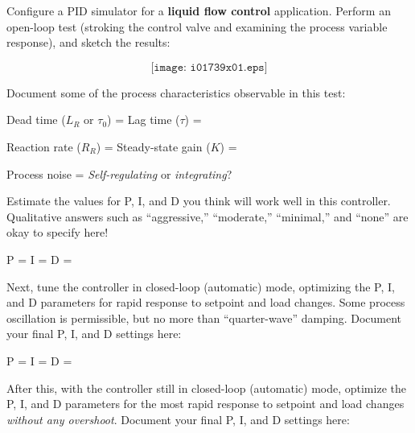 

Configure a PID simulator for a {\bf liquid flow control} application.  Perform an open-loop test (stroking the control valve and examining the process variable response), and sketch the results:

$$\texttt{[image: i01739x01.eps]}$$

Document some of the process characteristics observable in this test:

\vskip 20pt

Dead time ($L_R$ or $\tau_0$) = \underbar{\hskip 50pt} \hskip 50pt Lag time ($\tau$) = \underbar{\hskip 50pt} 

\vskip 10pt

Reaction rate ($R_R$) = \underbar{\hskip 50pt} \hskip 50pt Steady-state gain ($K$) = \underbar{\hskip 50pt}

\vskip 10pt

Process noise = \underbar{\hskip 70pt} \hskip 50pt {\it Self-regulating} or {\it integrating}?

\vskip 20pt

Estimate the values for P, I, and D you think will work well in this controller.  Qualitative answers such as ``aggressive,'' ``moderate,'' ``minimal,'' and ``none'' are okay to specify here!

\vskip 10pt

P = \underbar{\hskip 50pt} \hskip 50pt I = \underbar{\hskip 50pt} \hskip 50pt D = \underbar{\hskip 50pt}

\vskip 20pt

Next, tune the controller in closed-loop (automatic) mode, optimizing the P, I, and D parameters for rapid response to setpoint and load changes.  Some process oscillation is permissible, but no more than ``quarter-wave'' damping.  Document your final P, I, and D settings here:

\vskip 10pt

P = \underbar{\hskip 50pt} \hskip 50pt I = \underbar{\hskip 50pt} \hskip 50pt D = \underbar{\hskip 50pt}

\vskip 20pt

After this, with the controller still in closed-loop (automatic) mode, optimize the P, I, and D parameters for the most rapid response to setpoint and load changes {\it without any overshoot}.  Document your final P, I, and D settings here:

